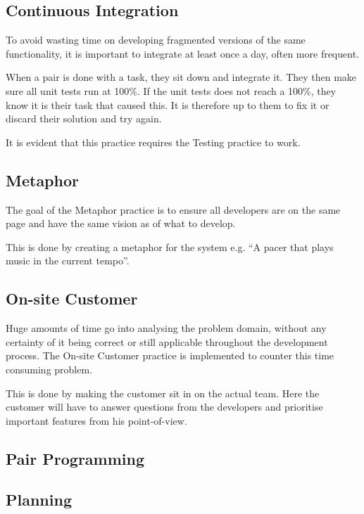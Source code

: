 \subsection{Continuous Integration}
To avoid wasting time on developing fragmented versions of the same functionality, it is important to integrate at least once a day, often more frequent.

When a pair is done with a task, they sit down and integrate it.
They then make sure all unit tests run at 100\%.
If the unit tests does not reach a 100\%, they know it is their task that caused this.
It is therefore up to them to fix it or discard their solution and try again.

It is evident that this practice requires the Testing practice to work.

\subsection{Metaphor}
The goal of the Metaphor practice is to ensure all developers are on the same page and have the same vision as of what to develop.

This is done by creating a metaphor for the system e.g. ``A pacer that plays music in the current tempo”.



\subsection{On-site Customer}
Huge amounts of time go into analysing the problem domain, without any certainty of it being correct or still applicable throughout the development process.
The On-site Customer practice is implemented to counter this time consuming problem.

This is done by making the customer sit in on the actual team.
Here the customer will have to answer questions from the developers and prioritise important features from his point-of-view.



\subsection{Pair Programming}






\subsection{Planning}


